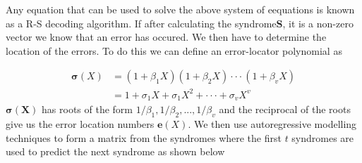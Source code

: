 \documentclass[fontsize=12pt]{article}
\begin{document}
Any equation that can be used to solve the above system of eequations is known as a R-S decoding algorithm. If after calculating the syndrome$\mathbf{S}$, it is a non-zero vector we know that an error has occured. We then have to determine the location of the errors. To do this we can define an error-locator polynomial as 

\begin{equation}
\begin{split}
\mathbf{\sigma}(X)&=(1+\beta_1X)(1+\beta_2X)\cdot\cdot\cdot(1+\beta_vX)\\
&=1+ \sigma_1X+\sigma_1X^2+\cdot\cdot\cdot+\sigma_vX^v
\end{split}
\end{equation}
$\mathbf{\sigma(X)}$ has roots of the form $1/\beta_1,1/\beta_2,...,1/\beta_v$ and the reciprocal of the roots give us the error location numbers $\mathbf{e}(X)$. We then use autoregressive modelling techniques to form a matrix from the syndromes where the first $t$ syndromes are used to predict the next syndrome as shown below
\end{document}
